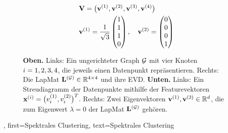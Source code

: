 {{{{{{\begin{figure}[H]
\begin{center}
				\vspace*{20mm}\\
				\begin{minipage}{0.4\textwidth}
				\end{minipage}
				\begin{minipage}{0.4\textwidth}
					\begin{align}
						& \mathbf{V} = \big( {\bf v}^{(1)},{\bf v}^{(2)},{\bf v}^{(3)},{\bf v}^{(4)} \big) \nonumber \\
						& \mathbf{v}^{(1)} = \frac{1}{\sqrt{3}} \begin{pmatrix} 1 \\ 1 \\ 1 \\ 0 \end{pmatrix}, \quad
						\mathbf{v}^{(2)} = \begin{pmatrix} 0 \\ 0 \\ 0 \\ 1 \end{pmatrix} \nonumber
					\end{align}
				\end{minipage}
				\caption{\label{fig_lap_mtx_specclustering_dict} 
					{\bf Oben.} Links: Ein ungerichteter \gls{Graph} $\mathcal{G}$ mit vier Knoten $i=1,2,3,4$, 
					die jeweils einen \gls{Datenpunkt} repräsentieren. Rechts: Die \gls{LapMat} 
					${\bf L}^{(\mathcal{G})} \in \mathbb{R}^{4 \times 4}$ und ihre \gls{EVD}. 
					{\bf Unten.} Links: Ein \gls{Streudiagramm} der \gls{Datenpunkte} mithilfe der 
					\gls{Featurevektoren} ${\bf x}^{(i)} = \big( v^{(1)}_{i}, v^{(2)}_{i} \big)^T$. 
					Rechts: Zwei \gls{Eigenvektoren} ${\bf v}^{(1)}, {\bf v}^{(2)} \in \mathbb{R}^{d}$, 
					die zum \gls{Eigenwert} $\lambda = 0$ der \gls{LapMat} ${\bf L}^{(\mathcal{G})}$ gehören.
				}
			\end{center}
		\end{figure}
		\newpage
	},
	first={Spektrales Clustering},
	text={Spektrales Clustering}
}


}}}}
